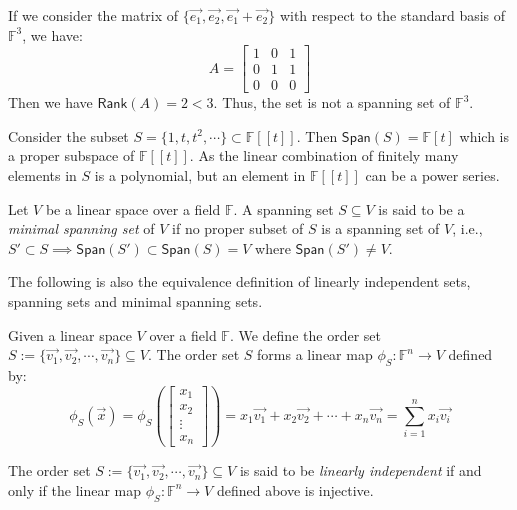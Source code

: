 \documentclass[
	11pt, %
	fleqn, %
	a4paper, %
]{LegrandOrangeBook}
\renewcommand{\span}[1]{\mathsf{Span}(#1)} %
\newcommand{\F}{\mathbb{F}} %
\newcommand{\rank}[1]{\mathsf{Rank}(#1)} %
\begin{document}
\begin{remark}
    If we consider the matrix of $\{\vec{e_1}, \vec{e_2}, \vec{e_1} + \vec{e_2}\}$ with respect to the standard basis of $\F^3$, we have:
    \[
        A = \begin{bmatrix}
            1 & 0 & 1 \\
            0 & 1 & 1 \\
            0 & 0 & 0
        \end{bmatrix}
    \]
    Then we have $\rank{A} = 2 < 3$. Thus, the set is not a spanning set of $\F^3$.
\end{remark}

\begin{example}
    Consider the subset $S = \{ 1, t, t^2, \cdots \} \subset \F[[t]]$. Then $\span{S} = \F[t]$ which is a proper subspace of $\F[[t]]$. As the linear combination of finitely many elements in $S$ is a polynomial, but an element in $\F[[t]]$ can be a power series.
\end{example}

\begin{definition}
    Let $V$ be a linear space over a field $\F$. A spanning set $S \subseteq V$ is said to be a \emph{minimal spanning set} of $V$ if no proper subset of $S$ is a spanning set of $V$, i.e., $S' \subset S \implies \span{S'} \subset \span{S} = V$ where $\span{S'} \neq V$.
\end{definition}

The following is also the equivalence definition of linearly independent sets, spanning sets and minimal spanning sets.

Given a linear space $V$ over a field $\F$. We define the order set $S := \{\vec{v_1}, \vec{v_2}, \cdots, \vec{v_n}\} \subseteq V$. The order set $S$ forms a linear map $\phi_S: \F^n \to V$ defined by:
\[
    \phi_S(\vec{x}) = \phi_S\left(\begin{bmatrix}
        x_1 \\
        x_2 \\
        \vdots \\
        x_n
    \end{bmatrix}\right) = x_1 \vec{v_1} + x_2 \vec{v_2} + \cdots + x_n \vec{v_n} = \sum_{i=1}^{n} x_i \vec{v_i}
\]

\begin{proposition}
    The order set $S := \{\vec{v_1}, \vec{v_2}, \cdots, \vec{v_n}\} \subseteq V$ is said to be \emph{linearly independent} if and only if the linear map $\phi_S: \F^n \to V$ defined above is injective.
\end{proposition}
\end{document}
